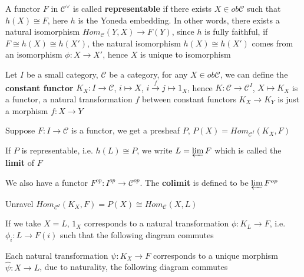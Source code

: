\documentclass[../main.tex]{subfiles}
\begin{document}
\begin{definition}
A functor $F$ in $\mathscr C^\vee$ is called \textbf{representable} if there exists $X\in ob\mathscr C$ such that $h(X)\cong F$, here $h$ is the Yoneda embedding. In other words, there exists a natural isomorphism $Hom_{\mathscr C}(Y,X)\to F(Y)$, since $h$ is fully faithful, if $F\cong h(X)\cong h(X')$, the natural isomorphism $h(X)\cong h(X')$ comes from an isomorphism $\phi:X\to X'$, hence $X$ is unique to isomorphism
\end{definition}

\begin{definition}
Let $I$ be a small category, $\mathscr C$ be a category, for any $X\in ob\mathscr C$, we can define the \textbf{constant functor} $K_X:I\to\mathscr C$, $i\mapsto X$, $i\xrightarrow{f}j\mapsto1_X$, hence $K:\mathscr C\to\mathscr C^I$, $X\mapsto K_X$ is a functor, a natural transformation $f$ between constant functors $K_X\to K_Y$ is just a morphism $f:X\to Y$
\end{definition}

\begin{definition}
Suppose $F:I\to\mathscr C$ is a functor, we get a presheaf $P$, $P(X)=Hom_{\mathscr C^I}(K_X,F)$ \par
If $P$ is representable, i.e. $h(L)\cong P$, we write $L=\varprojlim F$ which is called the \textbf{limit} of $F$ \par
We also have a functor $F^{op}:I^{op}\to\mathscr C^{op}$. The \textbf{colimit} is defined to be $\varprojlim F^{op}$
\end{definition}

\begin{remark}
Unravel $Hom_{\mathscr C^I}(K_X,F)=P(X)\cong Hom_{\mathscr C}(X,L)$ \par
If we take $X=L$, $1_X$ corresponds to a natural transformation $\phi:K_L\to F$, i.e. $\phi_i:L\to F(i)$ such that the following diagram commutes
\begin{center}
\end{center}
Each natural transformation $\psi:K_X\to F$ corresponds to a unique morphism $\widehat\psi:X\to L$, due to naturality, the following diagram commutes
\begin{center}
\end{center}
\end{remark}
\end{document}
